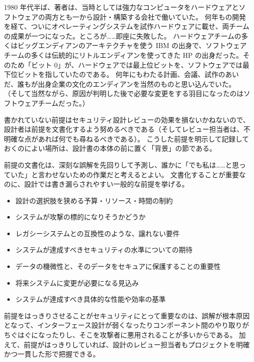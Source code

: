 \documentclass[uplatex]{jsarticle}
\def\label#1{}%
\begin{document}
\begin{exa}[ハードウェアとソフトウェアのエンディアンの食い違い]\label{exa:ch6-endianness}
1980 年代半ば、著者は、当時としては強力なコンピュータをハードウェアとソフトウェアの両方とも一から設計・構築する会社で働いていた。
何年もの開発を経て、ついにオペレーティングシステムを試作ハードウェアに載せ、両チームの成果が一つになった。ところが……即座に失敗した。
ハードウェアチームの多くはビッグエンディアンのアーキテクチャを使う IBM の出身で、ソフトウェアチームの多くは伝統的にリトルエンディアンを使ってきた HP の出身だった。そのため「ビット 0」が、ハードウェアでは最上位ビットを、ソフトウェアでは最下位ビットを指していたのである。
何年にもわたる計画、会議、試作のあいだ、誰もが出身企業の文化のエンディアンを当然のものと思い込んでいた。
（そして当然ながら、原因が判明した後で必要な変更をする羽目になったのはソフトウェアチームだった。）
\end{exa}

書かれていない前提はセキュリティ設計レビューの効果を損ないかねないので、設計者は前提を文書化するよう努めるべきである（そしてレビュー担当者は、不明確な点があれば何でも尋ねるべきである）。
こうした前提を明示して記録しておくのによい場所は、設計書の本体の前に置く「背景」の節である。

前提の文書化は、深刻な誤解を先回りして予測し、誰かに「でも私は……と思っていた」と言わせないための作業だと考えるとよい。
文書化することが重要なのに、設計では書き漏らされやすい一般的な前提を挙げる。
\begin{itemize}
\item 設計の選択肢を狭める予算・リソース・時間の制約
\item システムが攻撃の標的になりそうかどうか
\item レガシーシステムとの互換性のような、譲れない要件
\item システムが達成すべきセキュリティの水準についての期待
\item データの機微性と、そのデータをセキュアに保護することの重要性
\item 将来システムに変更が必要になる見込み
\item システムが達成すべき具体的な性能や効率の基準
\end{itemize}

前提をはっきりさせることがセキュリティにとって重要なのは、誤解が根本原因となって、インターフェース設計が弱くなったりコンポーネント間のやり取りがちぐはぐになったりし、そこを攻撃者に悪用されることが多いからである。
加えて、前提がはっきりしていれば、設計のレビュー担当者もプロジェクトを明確かつ一貫した形で把握できる。
\end{document}

